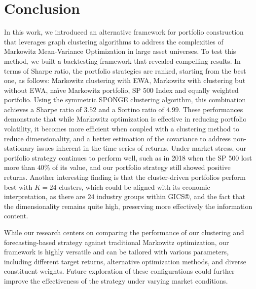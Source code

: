 \documentclass[sigconf]{acmart}
\begin{document}

\vspace{-2mm}
\section{Conclusion}
\label{conclusion}

In this work, we introduced an alternative framework for portfolio construction that leverages graph clustering algorithms to address the complexities of Markowitz Mean-Variance Optimization in large asset universes. To test this method, we built a backtesting framework that revealed compelling results. In terms of Sharpe ratio, the portfolio strategies are ranked, starting from the best one, as follows: Markowitz clustering with EWA, Markowitz with clustering but without EWA, naïve Markowitz portfolio, SP 500 Index and equally weighted portfolio. Using the symmetric SPONGE clustering algorithm, this combination achieves a Sharpe ratio of $3.52$ and a Sortino ratio of $4.99$. These performances demonstrate that while Markowitz optimization is effective in reducing portfolio volatility, it becomes more efficient when coupled with a clustering method to reduce dimensionality, and a better estimation of the covariance to address non-stationary issues inherent in the time series of returns. Under market stress, our portfolio strategy continues to perform well, such as in 2018 when the SP 500 lost more than $40$\% of its value, and our portfolio strategy still showed positive returns. Another interesting finding is that the cluster-driven portfolios perform best with $K=24$ clusters, which could be aligned with its economic interpretation, as there are $24$ industry groups within GICS®, and the fact that the dimensionality remains quite high, preserving more effectively the information content. 

While our research centers on comparing the performance of our clustering and forecasting-based strategy against traditional Markowitz optimization, our framework is highly versatile and can be tailored with various parameters, including different target returns, alternative optimization methods, and diverse constituent weights. Future exploration of these configurations could further improve the effectiveness of the strategy under varying market conditions. 
\end{document}
